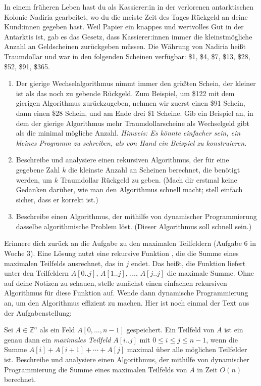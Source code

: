 \documentclass{uebung_cs}
\begin{document}
\begin{aufgabe}
    In einem früheren Leben hast du als Kassierer:in in der verlorenen antarktischen Kolonie Nadiria gearbeitet, wo du die meiste Zeit des Tages Rückgeld an deine Kund:innen gegeben hast.
    Weil Papier ein knappes und wertvolles Gut in der Antarktis ist, gab es das Gesetz, dass Kassierer:innen immer die kleinstmögliche Anzahl an Geldscheinen zurückgeben müssen.
    Die Währung von Nadiria heißt Traumdollar und war in den folgenden Scheinen verfügbar:
    \$1,
    \$4,
    \$7,
    \$13,
    \$28,
    \$52,
    \$91,
    \$365.
    \begin{enumerate}
        \item\bestehen Der gierige Wechselalgorithmus nimmt immer den größten Schein, der kleiner ist als das noch zu gebende Rückgeld. Zum Beispiel, um \$122 mit dem gierigen Algorithmus zurückzugeben, nehmen wir zuerst einen \$91 Schein, dann einen \$28 Schein, und am Ende drei \$1 Scheine. Gib ein Beispiel an, in dem der gierige Algorithmus mehr Traumdollarscheine als Wechselgeld gibt als die minimal mögliche Anzahl. \emph{Hinweis: Es könnte einfacher sein, ein kleines Programm zu schreiben, als von Hand ein Beispiel zu konstruieren.}
        \item\mittel Beschreibe und analysiere einen rekursiven Algorithmus, der für eine gegebene Zahl $k$ die kleinste Anzahl an Scheinen berechnet, die benötigt werden, um $k$ Traumdollar Rückgeld zu geben. (Mach dir erstmal keine Gedanken darüber, wie man den Algorithmus schnell macht; stell einfach sicher, dass er korrekt ist.)
        \item\mittel Beschreibe einen Algorithmus, der mithilfe von dynamischer Programmierung dasselbe algorithmische Problem löst. (Dieser Algorithmus soll schnell sein.)
    \end{enumerate}
\end{aufgabe}

\begin{aufgabe}
    Erinnere dich zurück an die Aufgabe zu den maximalen Teilfeldern (Aufgabe 6 in Woche 3).
    Eine Lösung nutzt eine rekursive Funktion
    , die die Summe eines maximalen Teilfelds ausrechnet, das in $j$ endet. Das heißt, die Funktion liefert unter den Teilfeldern $A[0..j]$, $A[1..j]$, $\dots$, $A[j..j]$ die maximale Summe.
    Ohne auf deine Notizen zu schauen, stelle zunächst einen einfachen rekursiven Algorithmus für diese Funktion auf. Wende dann dynamische Programmierung an, um den Algorithmus effizient zu machen. Hier ist noch einmal der Text aus der Aufgabenstellung:

    Sei $A \in \mathbb{Z}^n$ als ein Feld $A[0, \dots, n-1]$ gespeichert.
	Ein Teilfeld von $A$ ist ein genau dann ein \textit{maximales Teilfeld} $A[i..j]$ mit $0\leq i\leq j\leq n-1$, wenn die Summe $A[i] + A[i+1] + \cdots + A[j]$ maximal über alle möglichen Teilfelder ist.
    Beschreibe und analysiere einen Algorithmus, der mithilfe von dynamischer Programmierung die Summe eines maximalen Teilfelds von $A$ in Zeit $O(n)$ berechnet.
\end{aufgabe}
\end{document}

